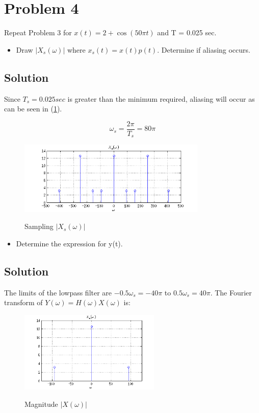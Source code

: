 \section*{Problem 4}

Repeat Problem 3 for $x(t) = 2 + \cos(50 \pi t)$ and T = 0.025 sec.

\begin{itemize}
\item  Draw $|X_s(\omega)|$ where $x_s(t) = x(t)p(t)$. Determine if aliasing occurs.
\end{itemize} 

\subsection*{Solution}

Since $T_s = 0.025 sec$ is greater than the minimum required,
aliasing will occur as can be seen in (\ref{fig:c3p4a}).

\begin{equation*}
\omega_s = \frac{2 \pi}{T_s} =  80 \pi
\end{equation*} 

\begin{figure}[H]
\caption{Sampling $|X_s(\omega)|$}
\centering
\includegraphics[width=0.8\textwidth]{figs/c3p4a.png}
\label{fig:c3p4a}
\end{figure}

\begin{itemize}
\item Determine the expression for y(t).
\end{itemize} 

\subsection*{Solution}

The limits of the lowpass filter are $-0.5 \omega_s = -40 \pi$ to $0.5 \omega_s = 40 \pi$.
The Fourier transform of $Y(\omega) = H(\omega)X(\omega)$ is:

\begin{figure}[H]
\caption{Magnitude $|X(\omega)|$}
\centering
\includegraphics[width=0.6\textwidth]{figs/c3p4b.png}
\label{fig:c3p4b}
\end{figure}

